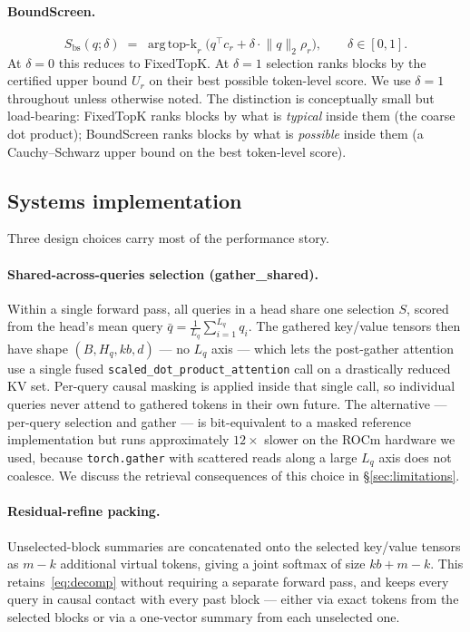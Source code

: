 \documentclass[11pt]{article}
\theoremstyle{plain}
\theoremstyle{definition}
\DeclareMathOperator*{\argtopk}{arg\,top\text{-}k}
\newcommand{\ur}{U_r}
\newcommand{\normq}{\lVert q \rVert_2}
\newcommand{\rad}{\rho_r}
\begin{document}
\paragraph{BoundScreen.}
\begin{equation}
S_{\mathrm{bs}}(q; \delta) \;=\; \argtopk_r\bigl(q^{\top} c_r + \delta \cdot \normq \rad\bigr), \qquad \delta \in [0, 1]. \label{eq:boundscreen}
\end{equation}
At $\delta = 0$ this reduces to FixedTopK. At $\delta = 1$ selection ranks
blocks by the certified upper bound $\ur$ on their best possible
token-level score. We use $\delta = 1$ throughout unless otherwise noted.
The distinction is conceptually small but load-bearing: FixedTopK ranks
blocks by what is \emph{typical} inside them (the coarse dot product);
BoundScreen ranks blocks by what is \emph{possible} inside them (a
Cauchy--Schwarz upper bound on the best token-level score).

\subsection{Systems implementation}
\label{sec:systems}

Three design choices carry most of the performance story.

\paragraph{Shared-across-queries selection (gather\_shared).}
Within a single forward pass, all queries in a head share one selection $S$,
scored from the head's mean query
$\bar q = \frac{1}{L_q} \sum_{i=1}^{L_q} q_i$. The gathered key/value
tensors then have shape $(B, H_q, kb, d)$ --- no $L_q$ axis --- which
lets the post-gather attention use a single fused
\texttt{scaled\_dot\_product\_attention} call on a drastically reduced KV
set. Per-query causal masking is applied inside that single call, so
individual queries never attend to gathered tokens in their own future.
The alternative --- per-query selection and gather --- is bit-equivalent
to a masked reference implementation but runs approximately $12\times$
slower on the ROCm hardware we used, because \texttt{torch.gather} with
scattered reads along a large $L_q$ axis does not coalesce. We discuss
the retrieval consequences of this choice in \S\ref{sec:limitations}.

\paragraph{Residual-refine packing.}
Unselected-block summaries are concatenated onto the selected key/value
tensors as $m - k$ additional virtual tokens, giving a joint softmax of
size $kb + m - k$. This retains~\eqref{eq:decomp} without requiring a
separate forward pass, and keeps every query in causal contact with every
past block --- either via exact tokens from the selected blocks or via
a one-vector summary from each unselected one.
\end{document}
